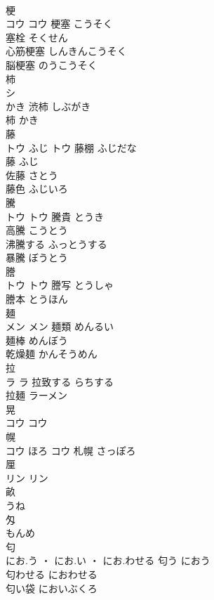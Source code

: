 \documentclass[8pt]{extreport}
\begin{document}
\begin{CJK}{UTF8}{min}
\\	梗	
\\	コウ		コウ	梗塞	こうそく	
\\	塞栓	そくせん	
\\	心筋梗塞	しんきんこうそく	
\\	脳梗塞	のうこうそく	
\\	柿	
\\	シ
\\	かき		渋柿	しぶがき	
\\	柿	かき	
\\	藤	
\\	トウ	ふじ	トウ	藤棚	ふじだな	
\\	藤	ふじ	
\\	佐藤	さとう	
\\	藤色	ふじいろ	
\\	騰	
\\	トウ		トウ	騰貴	とうき	
\\	高騰	こうとう	
\\	沸騰する	ふっとうする	
\\	暴騰	ぼうとう	
\\	謄	
\\	トウ		トウ	謄写	とうしゃ	
\\	謄本	とうほん	
\\	麺	
\\	メン		メン	麺類	めんるい	
\\	麺棒	めんぼう	
\\	乾燥麺	かんそうめん	
\\	拉	
\\	ラ		ラ	拉致する	らちする	
\\	拉麺	ラーメン	
\\	晃	
\\	コウ		コウ																																			
\\	幌	
\\	コウ	ほろ	コウ													札幌	さっぽろ	
\\	厘	
\\	リン		リン																																			
\\	畝	
\\	うね																																				
\\	匁	
\\	もんめ																																				
\\	匂	
\\	にお.う ・ にお.い ・ にお.わせる		匂う	におう	
\\	匂わせる	におわせる	
\\	匂い袋	においぶくろ	

\end{CJK}
\end{document}

